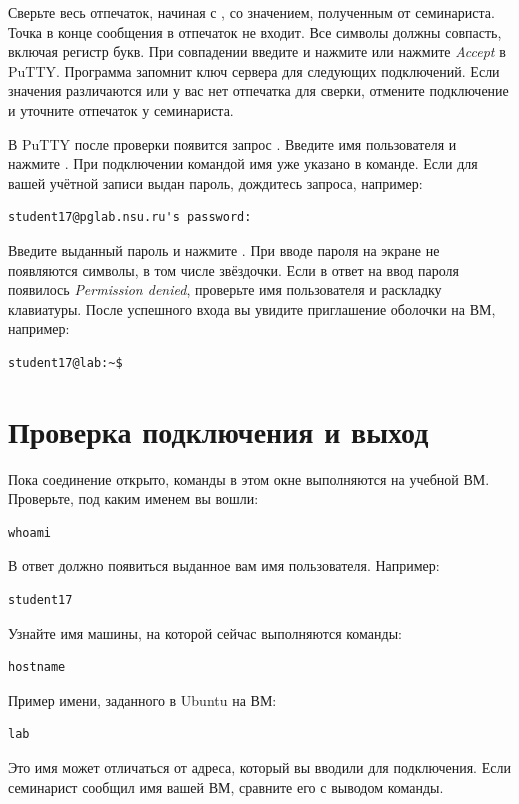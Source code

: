 Сверьте весь отпечаток, начиная с , со значением,
полученным от семинариста. Точка в конце сообщения в отпечаток не
входит. Все символы должны совпасть, включая регистр букв. При совпадении введите
 и нажмите  или нажмите \emph{Accept} в PuTTY.
Программа запомнит ключ сервера для следующих подключений.
Если значения различаются или у вас нет отпечатка для сверки, отмените
подключение и уточните отпечаток у семинариста.

В PuTTY после проверки появится запрос . Введите имя
пользователя и нажмите . При подключении командой 
имя уже указано в команде. Если для вашей учётной записи выдан пароль,
дождитесь запроса, например:
\begin{verbatim}
student17@pglab.nsu.ru's password:
\end{verbatim}
Введите выданный пароль и нажмите . При вводе пароля на
экране не появляются символы, в том числе звёздочки. Если в ответ на ввод
пароля появилось \emph{Permission denied}, проверьте имя пользователя
и раскладку клавиатуры. После успешного
входа вы увидите приглашение оболочки на ВМ, например:
\begin{verbatim}
student17@lab:~$
\end{verbatim}

\section{Проверка подключения и выход}
\label{sec:verify-env}

Пока соединение открыто, команды в этом окне выполняются на учебной ВМ.
Проверьте, под каким именем вы вошли:
\begin{verbatim}
whoami
\end{verbatim}
В ответ должно появиться выданное вам имя пользователя. Например:
\begin{verbatim}
student17
\end{verbatim}

Узнайте имя машины, на которой сейчас выполняются команды:
\begin{verbatim}
hostname
\end{verbatim}
Пример имени, заданного в Ubuntu на ВМ:
\begin{verbatim}
lab
\end{verbatim}
Это имя может отличаться от адреса, который вы вводили для подключения.
Если семинарист сообщил имя вашей ВМ, сравните его с выводом команды.

